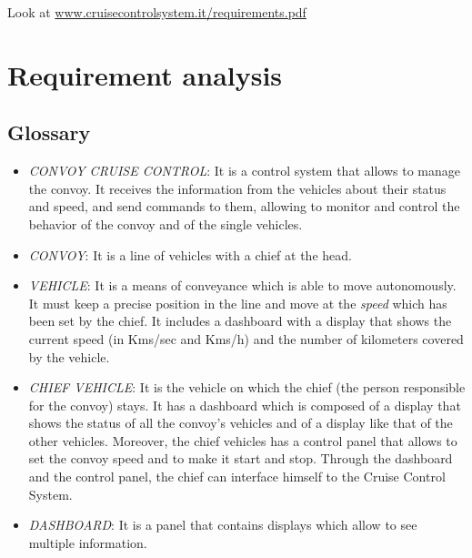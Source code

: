 \documentclass{llncs}
\newcommand{\labelsec}[1]{\label{sec:#1}}
\begin{document}
Look at \url{www.cruisecontrolsystem.it/requirements.pdf}

\section{Requirement analysis}
\labelsec{ReqAnalysis}



\subsection{Glossary}
\begin{itemize}
  \item \emph{CONVOY CRUISE CONTROL}: It is a control system that allows to manage the convoy. It receives the information from the vehicles about their status and speed, and send commands to them, allowing to monitor and control the behavior of the convoy and of the single vehicles.\\

  \item \emph{CONVOY}: It is a line of vehicles with a chief at the head.\\

  \item \emph{VEHICLE}: It is a means of conveyance which is able to move autonomously. It must keep a precise position in the line and move at the \emph{speed} which has been set by the chief. It includes a dashboard with a display that shows the current speed (in Kms/sec and Kms/h) and the number of kilometers covered by the vehicle.\\

  \item \emph{CHIEF VEHICLE}: It is the vehicle on which the chief (the person responsible for the convoy) stays. It has a dashboard which is composed of a display that shows the status of all the convoy's vehicles and of a display like that of the other vehicles. Moreover, the chief vehicles has a control panel that allows to set the convoy speed and to make it start and stop. Through the dashboard and the control panel, the chief can interface himself to the Cruise Control System. \\

  \item \emph{DASHBOARD}: It is a panel that contains displays which allow to see multiple information. \\


\end{itemize}
\end{document}
